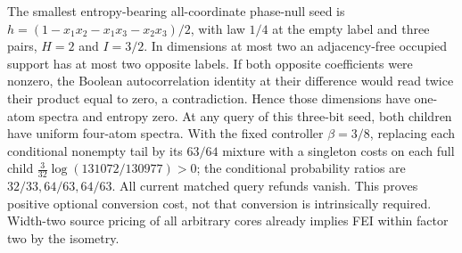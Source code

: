 \documentclass[11pt]{article}
\begin{document}
The smallest entropy-bearing all-coordinate phase-null seed is
$h=(1-x_1x_2-x_1x_3-x_2x_3)/2$, with law $1/4$ at the empty label and
three pairs, $H=2$ and $I=3/2$. In dimensions at most two an
adjacency-free occupied support has at most two opposite labels. If both
opposite coefficients were nonzero, the Boolean autocorrelation identity
at their difference would read twice their product equal to zero, a
contradiction. Hence those dimensions have one-atom spectra and entropy
zero. At any query of this three-bit seed, both children have uniform
four-atom spectra. With the fixed controller $\beta=3/8$, replacing each
conditional nonempty tail by its $63/64$ mixture with a singleton costs
on each full child
$\frac3{32}\log(131072/130977)>0$; the conditional probability ratios
are $32/33,64/63,64/63$. All current matched query refunds vanish.
This proves positive optional conversion cost, not that conversion is
intrinsically required. Width-two source pricing of all arbitrary cores
already implies FEI within factor two by the isometry.
\end{document}
